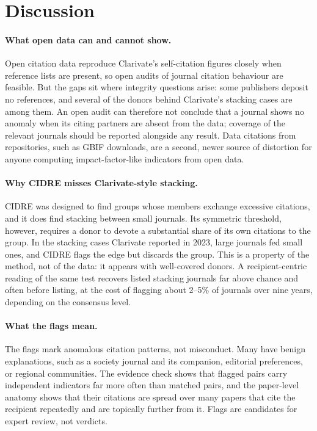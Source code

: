 \section{Discussion}\label{sec:discussion}

\paragraph{What open data can and cannot show.}
Open citation data reproduce Clarivate's self-citation figures closely when reference lists are present, so open
audits of journal citation behaviour are feasible. But the gaps sit where integrity questions arise: some publishers
deposit no references, and several of the donors behind Clarivate's stacking cases are among them. An open audit can
therefore not conclude that a journal shows no anomaly when its citing partners are absent from the data; coverage
of the relevant journals should be reported alongside any result. Data citations from repositories, such as GBIF
downloads, are a second, newer source of distortion for anyone computing impact-factor-like indicators from open
data.

\paragraph{Why CIDRE misses Clarivate-style stacking.}
CIDRE was designed to find groups whose members exchange excessive citations, and it does find stacking between small
journals. Its symmetric threshold, however, requires a donor to devote a substantial share of its own citations to the
group. In the stacking cases Clarivate reported in 2023, large journals fed small ones, and CIDRE flags the edge but
discards the group. This is a property of the method, not of the data: it appears with well-covered donors. A
recipient-centric reading of the same test recovers listed stacking journals far above chance and often before
listing, at the cost of flagging about 2--5\% of journals over nine years, depending on the consensus level.

\paragraph{What the flags mean.}
The flags mark anomalous citation patterns, not misconduct. Many have benign explanations, such as a society journal
and its companion, editorial preferences, or regional communities. The evidence check shows that flagged pairs carry
independent indicators far more often than matched pairs, and the paper-level anatomy shows that their citations are
spread over many papers that cite the recipient repeatedly and are topically further from it. Flags are candidates for
expert review, not verdicts.

